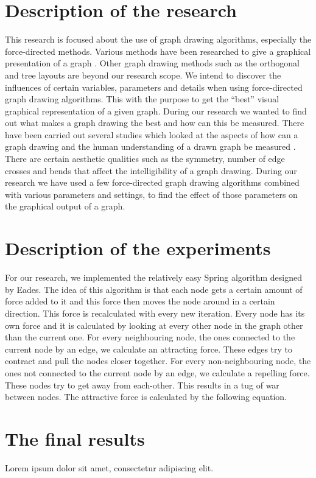 \documentclass[a4paper,12pt,twoside]{article}
\begin{document}
\section{Description of the research}
This research is focused about the use of graph drawing algorithms, especially the force-directed methods. Various methods have been researched to give a graphical presentation of a graph \cite{Ioannis G Tollis}. Other graph drawing methods such as the orthogonal and tree layouts are beyond our research scope. We intend to discover the influences of certain variables, parameters and details when using force-directed graph drawing algorithms. This with the purpose to get the “best” visual graphical representation of a given graph. During our research we wanted to find out what makes a graph drawing the best and how can this be measured.\newline
There have been carried out several studies which looked at the aspects of how can a graph drawing and the human understanding of a drawn graph be measured \cite{Purchase}. There are certain aesthetic qualities such as the symmetry, number of edge crosses and bends that affect the intelligibility of a graph drawing. During our research we have used a few force-directed graph drawing algorithms combined with various parameters and settings, to find the effect of those parameters on the graphical output of a graph.

\section{Description of the experiments}
For our research, we implemented the relatively easy Spring algorithm designed by Eades\cite{Eades}. The idea of this algorithm is that each node gets a certain amount of force added to it and this force then moves the node around in a certain direction. This force is recalculated with every new iteration. Every node has its own force and it is calculated by looking at every other node in the graph other than the current one. For every neighbouring node, the ones connected to the current node by an edge, we calculate an attracting force. These edges try to contract and pull the nodes closer together. For every non-neighbouring node, the ones not connected to the current node by an edge, we calculate a repelling force. These nodes try to get away from each-other. This results in a tug of war between nodes. The attractive force is calculated by the following equation.


\section{The final results}
Lorem ipsum dolor sit amet, consectetur adipiscing elit.
\end{document}
